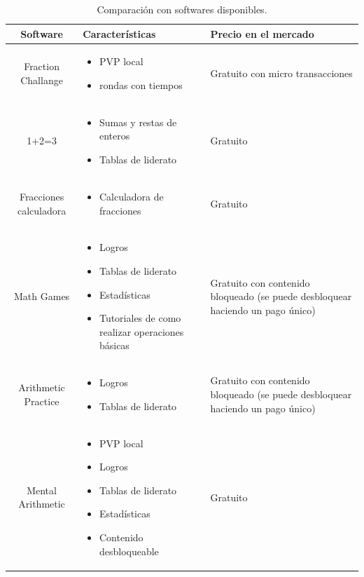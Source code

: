 \documentclass{article}
\begin{document}
\begin{table}[H]
\centering
\begin{tabular}{|c|M{6cm}|M{5cm}|}
\hline
Software & Características & Precio en el mercado \\ \hline

Fraction Challange & 
\begin{itemize}
	\item PVP local
	\item rondas con tiempos
\end{itemize} & 
Gratuito con micro transacciones \\ \hline


1+2=3 & 
\begin{itemize}
	\item Sumas y restas de enteros
	\item Tablas de liderato 
\end{itemize}& 
Gratuito \\ \hline


Fracciones calculadora & 
\begin{itemize}
	\item Calculadora de fracciones
\end{itemize}& 
Gratuito \\ \hline


Math Games & 
\begin{itemize}
	\item Logros
	\item Tablas de liderato
	\item Estadísticas
	\item Tutoriales de como realizar operaciones básicas
\end{itemize} & 
Gratuito con contenido bloqueado (se puede desbloquear haciendo un pago único) \\ \hline

Arithmetic Practice & 
\begin{itemize}
	\item Logros
	\item Tablas de liderato
\end{itemize} & 
Gratuito con contenido bloqueado (se puede desbloquear haciendo un pago único) \\ \hline


Mental Arithmetic  & 
\begin{itemize}
	\item PVP local
	\item Logros
	\item Tablas de liderato
	\item Estadísticas
	\item Contenido desbloqueable
\end{itemize} & 
Gratuito \\ \hline

\end{tabular}
\label{tab:software}
\caption{Comparación con softwares disponibles.}
\end{table}
\end{document}
